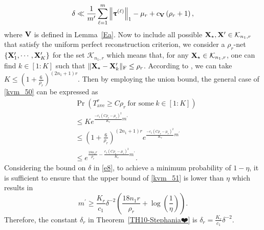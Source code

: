 \documentclass[12pt,draftcls,onecolumn]{IEEEtran}
\begin{document}
\begin{equation}
\label{e8}
\delta\ll\frac{1}{m^{\prime}}\sum_{\ell=1}^{m}\left\|\boldsymbol{\uptau}^{(\ell)}\right\|_1-\mu_r
+c_{\mbV}\left(\rho_r+1\right),
\end{equation}
where $\mathbf{V}$ is defined in Lemma~\ref{Ea}.
Now to include all possible $\mathbf{X}_{\star},\mathbf{X}^{\prime}\in\mathcal{K}_{n_1,r}$ that satisfy the uniform perfect reconstruction criterion,
we consider a $\rho_r$-net $\left\{\mathbf{X}^{\prime}_1,\cdots,\mathbf{X}^{\prime}_K\right\}$ for the set $\mathcal{K}_{n_1,r}$ which means that, for any $\mathbf{X}_{\star}\in\mathcal{K}_{n_1,r}$, one can find $k\in[1:K]$ such that $\|\mathbf{X}_{\star}-\mathbf{X}^{\prime}_k\|_{\mathrm{F}}\leq\rho_r$. According to \cite[Lemma~3.1]{candes2011tight}, we can take $K\leq\left(1+\frac{6}{\rho_r}\right)^{(2n_1+1)r}$.
Then by employing the union bound, the general case of \eqref{kvm_50} can be expressed as
\begin{equation}
\label{kvm_51}
\begin{aligned}
&\operatorname{Pr}\left(T_{\mathrm{ave}}^{r}\geq C\rho_r~\text{for some}~k\in[1:K]\right)\\&\leq Ke^{\frac{-c_1\left(C\rho_r-\mu_r\right)^{2}}{K_r}m^{\prime}}\\&\leq\left(1+\frac{6}{\rho_r}\right)^{(2n_1+1)r}e^{\frac{-c_1\left(C\rho_r-\mu_r\right)^{2}}{K_r}m^{\prime}}\\&\leq e^{\frac{18n_1r}{\rho_r}-\frac{c_1\left(C\rho_r-\mu_r\right)^{2}}{K_r}m^{\prime}}.
\end{aligned}
\end{equation}
Considering the bound on $\delta$ in \eqref{e8}, to achieve a minimum probability of $1-\eta$, it is sufficient to ensure that the upper bound of \eqref{kvm_51} is lower than $\eta$ which results in
\begin{equation}
\label{kvm_52}
m^{\prime}\geq\frac{K_r}{c_1}\delta^{-2}\left(\frac{18n_1r}{\rho_r}+\log\left(\frac{1}{\eta}\right)\right).
\end{equation}
Therefore, the constant $\delta_r$ in Theorem~\ref{TH10-Stephania❤️} is $\delta_r=\frac{K_r}{c_1}\delta^{-2}$.
\end{document}
